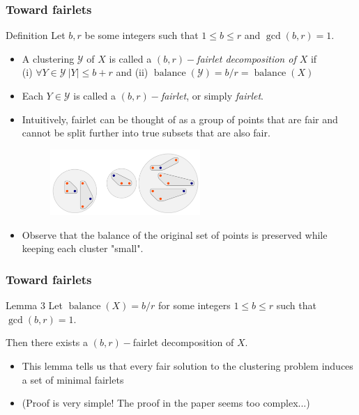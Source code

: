 \documentclass{beamer}
\DeclareMathOperator{\balance}{balance}
\begin{document}


\begin{frame}
\frametitle{Toward fairlets }

\begin{alertblock}{Definition}
Let $b, r$ be some integers such that $1 \leq b \leq r$ and $\gcd(b, r) = 1$.

\begin{itemize}
	\item A clustering $\mathcal{Y}$ of $X$ is called a {\it $(b, r)-$fairlet decomposition of $X$} if\\
	(i) $\forall Y \in \mathcal{Y} \ |Y| \leq b + r$ and (ii) $\balance(\mathcal{Y}) = b/r = \balance(X)$
	\item Each $Y \in \mathcal{Y}$ is called a {\it $(b, r)-$fairlet}, or simply {\it fairlet}.
\end{itemize}

\end{alertblock} \pause

\begin{itemize}
	\item Intuitively, fairlet can be thought of as a group of points that are fair and cannot be split further into true subsets that are also fair.
		\begin{figure}[hbt]
  			\includegraphics[height=2.5cm]{fig2.png}
		\end{figure} \pause
	\item Observe that the balance of the original set of points is preserved while keeping each cluster "small".
\end{itemize}

\end{frame}


\begin{frame}
\frametitle{Toward fairlets}

\begin{block}{Lemma 3}
Let $\balance(X) = b/r$ for some integers $1 \leq b \leq r$ such that $\gcd(b, r) = 1$.

Then there exists a $(b, r)-$fairlet decomposition of $X$.
\end{block} \pause

\begin{itemize}
	\item This lemma tells us that every fair solution to the clustering problem induces a set of minimal fairlets
	\item (Proof is very simple! The proof in the paper seems too complex...)
\end{itemize}

\end{frame}
\end{document}
